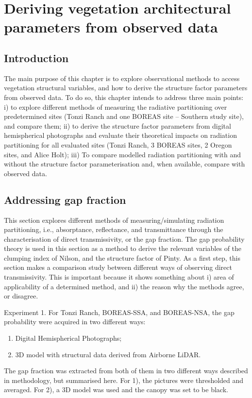 \documentclass[a4paper,11pt]{report}
\title{}
\author{Renato Kerches Braghiere \\ This document was written in \LaTeX \\ Number of words: 12213}
\date{\today}
\begin{document}
\maketitle
\setcounter{chapter}{4} %

\chapter{Deriving vegetation architectural parameters from observed data}

\section{Introduction}\label{introduction}

The main purpose of this chapter is to explore observational methods to access vegetation structural variables, and how to derive the structure factor parameters from observed data.  To do so, this chapter intends to address three main points: i) to explore different methods of measuring the radiative partitioning over predetermined sites (Tonzi Ranch and one BOREAS site – Southern study site), and compare them; ii) to derive the structure factor parameters from digital hemispherical photographs and evaluate their theoretical impacts on radiation partitioning for all evaluated sites (Tonzi Ranch, 3 BOREAS sites, 2 Oregon sites, and Alice Holt); iii) To compare modelled radiation partitioning with and without the structure factor parameterisation and, when available, compare with observed data.

\section{Addressing gap fraction}\label{section:hemiphotos}

This section explores different methods of measuring/simulating radiation partitioning, i.e., absorptance, reflectance, and transmittance through the characterisation of direct transmissivity, or the gap fraction. The gap probability theory is used in this section as a method to derive the relevant variables of the clumping index of Nilson, and the structure factor of Pinty. As a first step, this section makes a comparison study between different ways of observing direct transmissivity. This is important because it shows something about i) area of applicability of a determined method, and ii) the reason why the methods agree, or disagree.

Experiment 1. For Tonzi Ranch, BOREAS-SSA, and BOREAS-NSA, the gap probability were acquired in two different ways:
\begin{enumerate}
\item Digital Hemispherical Photographs;
\item 3D model with structural data derived from Airborne LiDAR.
\end{enumerate}
The gap fraction was extracted from both of them in two different ways described in methodology, but summarised here. For 1), the pictures were thresholded and averaged. For 2), a 3D model was used and the canopy was set to be black.
\end{document}
